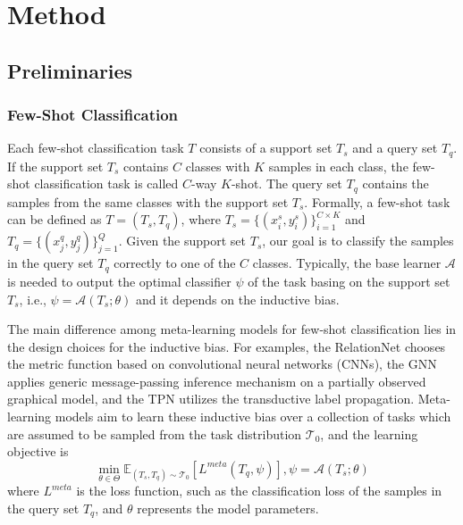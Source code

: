 \documentclass{article}
\begin{document}
\section{Method}
\subsection{Preliminaries}
\subsubsection{Few-Shot Classification} 
Each few-shot classification task $T$ consists of a support set $T_s$ and a query set $T_q$. If the support set $T_s$ contains $C$ classes with $K$ samples in each class, the few-shot classification task is called $C$-way $K$-shot. The query set $T_q$ contains the samples from the same classes with the support set $T_s$. Formally, a few-shot task can be defined as $T=(T_s,T_q)$, where $T_s=\{(x_i^s,y_i^s)\}_{i=1}^{C\times K}$ and $T_q=\{(x_j^q,y_j^q)\}_{j=1}^{Q}$. Given the support set $T_s$, our goal is to classify the samples in the query set $T_q$ correctly to one of the $C$ classes. Typically, the base learner $\mathcal{A}$ is needed to output the optimal classifier $\psi$ of the task basing on the support set $T_s$, i.e., $\psi=\mathcal{A}(T_s;\theta)$ and it depends on the inductive bias.

The main difference among meta-learning models for few-shot classification lies in the design choices for the inductive bias. For examples, the RelationNet \cite{sung2018learning} chooses the metric function based on convolutional neural networks (CNNs), the GNN \cite{garcia2018few} applies generic message-passing inference mechanism on a partially observed graphical model, and the TPN \cite{liu2019learning} utilizes the transductive label propagation. Meta-learning models aim to learn these inductive bias over a collection of tasks which are assumed to be sampled from the task distribution $\mathcal{T}_0$, and the learning objective is
\begin{equation}\label{ml1}
    \min_{\theta\in\Theta}\mathbb{E}_{(T_s,T_q)\sim\mathcal{T}_0}[L^{meta}(T_q,\psi)],\psi=\mathcal{A}(T_s;\theta)
\end{equation}
where $L^{meta}$ is the loss function, such as the classification loss of the samples in the query set $T_q$, and $\theta$ represents the model parameters.
\end{document}
